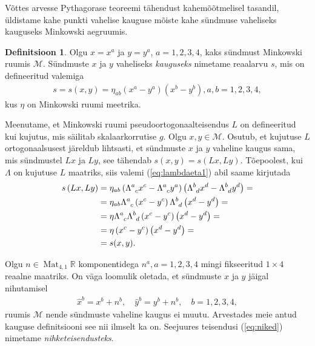 \documentclass[12pt,a4paper,oneside]{article}
\theoremstyle{plain}
\theoremstyle{definition}
\newtheorem{definitsioon}{Definitsioon}[section]
\numberwithin{equation}{section}
\def\R{{\mathbb R}}
\def\M{{\mathcal M}}
\DeclareMathOperator{\Mat}{Mat}
\begin{document}
Võttes arvesse Pythagorase teoreemi tähendust kahemõõtmelisel 
tasandil, üldi\-stame 
kahe punkti vahelise kauguse mõiste kahe sündmuse vaheliseks 
kauguseks Minkowski aegruumis.

\begin{definitsioon}
Olgu $x = x^a$ ja $y = y^a$, $a = 1, 2, 3, 4$, kaks sündmust 
Minkowski ruumis $\M$. Sündmuste $x$ ja $y$ vaheliseks 
\emph{kauguseks} nimetame reaalarvu $s$, mis on defineeritud 
valemiga
\begin{align*}
s = s\left(x, y\right) = \eta_{ab} \left(x^a - y^a\right)
\left(x^b - y^b\right), a,b = 1, 2, 3, 4,
\end{align*}
kus $\eta$ on Minkowski ruumi meetrika.
\end{definitsioon}

Meenutame, et Minkowski ruumi pseudoortogonaalteisendus $L$ on 
defineeritud kui kujutus, mis säilitab skalaarkorrutise $g$. Olgu 
$x, y \in \M$. Osutub, et kujutuse $L$ ortogonaalsusest järeldub 
lihtsasti, et sündmuste $x$ ja $y$ vaheline kaugus sama, mis 
sündmustel $Lx$ ja $Ly$, see tähendab $s\left(x, y\right) = 
s\left(Lx, Ly\right)$. Tõepoolest, kui $\Lambda$ on kujutuse $L$ 
maatriks, siis valemi (\ref{eq:lambdaeta1}) abil saame kirjutada
\begin{align*}
s\left(Lx, Ly\right) &= \eta_{ab} \left(\Lambda\indices{^a_c} x^c - 
	\Lambda\indices{^a_c} y^a\right) \left(\Lambda\indices{^b_d} 
	x^d - \Lambda\indices{^b_d} y^d\right) = \\
&= \eta_{ab} \Lambda\indices{^a_c} \left(x^c - y^c\right) 
	\Lambda\indices{^b_d} \left(x^d - y^d\right) = \\
&= \eta \Lambda\indices{^a_c} \Lambda\indices{^b_d} 
	\left(x^c - y^c\right) \left(x^d - y^d\right) = \\
&= \eta \left(x^c - y^c\right) \left(x^d - y^d\right) = \\
&= s(x, y).
\end{align*}

Olgu $n \in \Mat_{4, 1} \R$ komponentidega $n^a, a = 1, 2, 3, 4$ 
mingi fikseeritud $1 \times 4$ reaalne maatriks. On väga loomulik 
oletada, et sündmuste $x$ ja $y$ jäigal nihutamisel
\begin{align} \label{eq:niked}
\hat{x}^b = x^b + n^b, \quad \hat{y}^b = y^b + n^b, \quad 
b = 1, 2, 3, 4,
\end{align}
ruumis $\M$ nende sündmuste vaheline kaugus ei muutu. Arvestades 
meie antud kauguse definitsiooni see nii ilmselt ka on. Seejuures 
teisendusi (\ref{eq:niked}) nimetame \emph{nihketeisendusteks}.
\end{document}
